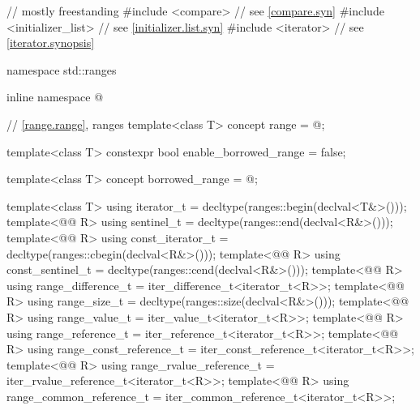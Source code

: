 %
%
\begin{codeblock}
// mostly freestanding
#include <compare>              // see \ref{compare.syn}
#include <initializer_list>     // see \ref{initializer.list.syn}
#include <iterator>             // see \ref{iterator.synopsis}

namespace std::ranges {
  inline namespace @

  // \ref{range.range}, ranges
  template<class T>
    concept range = @\seebelow@;

  template<class T>
    constexpr bool enable_borrowed_range = false;

  template<class T>
    concept borrowed_range = @\seebelow@;

  template<class T>
    using iterator_t = decltype(ranges::begin(declval<T&>()));
  template<@@ R>
    using sentinel_t = decltype(ranges::end(declval<R&>()));
  template<@@ R>
    using const_iterator_t = decltype(ranges::cbegin(declval<R&>()));
  template<@@ R>
    using const_sentinel_t = decltype(ranges::cend(declval<R&>()));
  template<@@ R>
    using range_difference_t = iter_difference_t<iterator_t<R>>;
  template<@@ R>
    using range_size_t = decltype(ranges::size(declval<R&>()));
  template<@@ R>
    using range_value_t = iter_value_t<iterator_t<R>>;
  template<@@ R>
    using range_reference_t = iter_reference_t<iterator_t<R>>;
  template<@@ R>
    using range_const_reference_t = iter_const_reference_t<iterator_t<R>>;
  template<@@ R>
    using range_rvalue_reference_t = iter_rvalue_reference_t<iterator_t<R>>;
  template<@@ R>
    using range_common_reference_t = iter_common_reference_t<iterator_t<R>>;

}
\end{codeblock}
